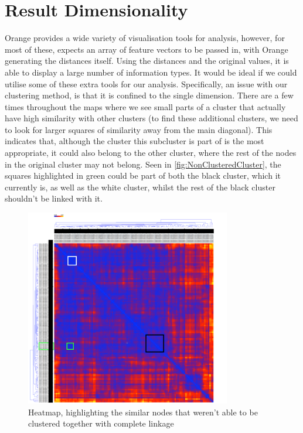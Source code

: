 \section{Result Dimensionality}
\label{sec:VisTech}
Orange provides a wide variety of visualisation tools for analysis, however,
for most of these, expects an array of feature vectors to be passed in, with
Orange generating the distances itself. Using the distances and the original
values, it is able to display a large number of information types. It would be
ideal if we could utilise some of these extra tools for our analysis. Specifically,
an issue with our clustering method, is that it is confined to the single dimension.
There are a few times throughout the maps where we see small parts of a cluster
that actually have high similarity with other clusters (to find these 
additional clusters, we need to look for larger squares of similarity away from
the main diagonal). This indicates that, although the cluster this subcluster
is part of is the most appropriate, it could also belong to the other cluster,
where the rest of the nodes in the original cluster may not belong. Seen in
\cref{fig:NonClusteredCluster}, the squares highlighted in green could be part
of both the black cluster, which it currently is, as well as the white cluster,
whilst the rest of the black cluster shouldn't be linked with it. 

\begin{figure}[h!]

	\centering
		\includegraphics[width=0.8\textwidth]{Figures/NonClusteredCluster}
	\caption{Heatmap, highlighting the similar nodes that weren't able
	to be clustered together with complete linkage}
	\label{fig:TopMarkComparison}

\end{figure}


